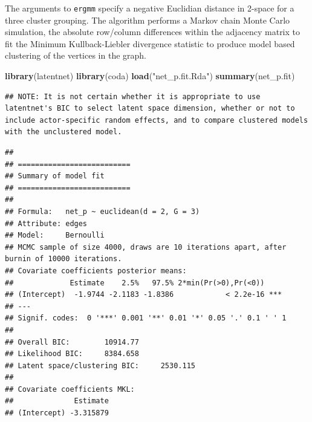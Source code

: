 \documentclass[]{article}
\newenvironment{Shaded}{\begin{snugshade}}{\end{snugshade}}
\newcommand{\KeywordTok}[1]{\textcolor[rgb]{0.13,0.29,0.53}{\textbf{#1}}}
\newcommand{\NormalTok}[1]{#1}
\newcommand{\StringTok}[1]{\textcolor[rgb]{0.31,0.60,0.02}{#1}}
\begin{document}
The arguments to \texttt{ergmm} specify a negative Euclidian distance in
2-space for a three cluster grouping. The algorithm performs a Markov
chain Monte Carlo simulation, the absolute row/column differences within
the adjacency matrix to fit the Minimum Kullback-Liebler divergence
statistic to produce model based clustering of the vertices in the
graph.

\begin{Shaded}
\begin{Highlighting}[]
\KeywordTok{library}\NormalTok{(latentnet)}
\KeywordTok{library}\NormalTok{(coda)}
\KeywordTok{load}\NormalTok{(}\StringTok{"net_p.fit.Rda"}\NormalTok{)}
\KeywordTok{summary}\NormalTok{(net_p.fit)}
\end{Highlighting}
\end{Shaded}

\begin{verbatim}
## NOTE: It is not certain whether it is appropriate to use latentnet's BIC to select latent space dimension, whether or not to include actor-specific random effects, and to compare clustered models with the unclustered model.
\end{verbatim}

\begin{verbatim}
## 
## ==========================
## Summary of model fit
## ==========================
## 
## Formula:   net_p ~ euclidean(d = 2, G = 3)
## Attribute: edges
## Model:     Bernoulli 
## MCMC sample of size 4000, draws are 10 iterations apart, after burnin of 10000 iterations.
## Covariate coefficients posterior means:
##             Estimate    2.5%   97.5% 2*min(Pr(>0),Pr(<0))    
## (Intercept)  -1.9744 -2.1183 -1.8386            < 2.2e-16 ***
## ---
## Signif. codes:  0 '***' 0.001 '**' 0.01 '*' 0.05 '.' 0.1 ' ' 1
## 
## Overall BIC:        10914.77 
## Likelihood BIC:     8384.658 
## Latent space/clustering BIC:     2530.115 
## 
## Covariate coefficients MKL:
##              Estimate
## (Intercept) -3.315879
\end{verbatim}
\end{document}
